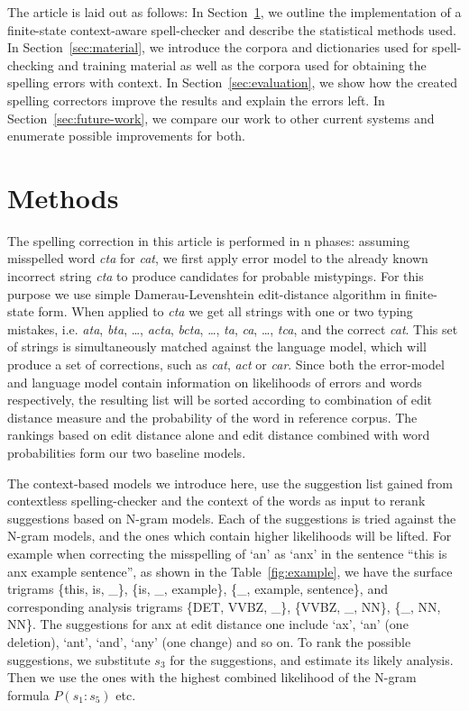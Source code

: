 \documentclass{llncs}
\begin{document}
The article is laid out as follows: In Section~\ref{sec:methods}, we outline
the implementation of a finite-state context-aware spell-checker and describe
the statistical methods used.  In Section~\ref{sec:material}, we introduce the
corpora and dictionaries used for spell-checking and training material as well
as the corpora used for obtaining the spelling errors with context. In
Section~\ref{sec:evaluation}, we show how the created spelling correctors
improve the results and explain the errors left. In
Section~\ref{sec:future-work}, we compare our work to other current systems and
enumerate possible improvements for both.

\section{Methods}
\label{sec:methods}

The spelling correction in this article is performed in n phases: assuming 
misspelled word \emph{cta} for \emph{cat}, we first apply error model to
the already known incorrect string \emph{cta} to produce candidates for probable
mistypings. For this purpose we use simple Damerau-Levenshtein edit-distance
algorithm in finite-state form. When applied to \emph{cta} we get all strings
with one or two typing mistakes, i.e. \emph{ata}, \emph{bta}, \ldots, 
\emph{acta}, \emph{bcta}, \ldots, \emph{ta}, \emph{ca}, \ldots, \emph{tca}, and
the correct \emph{cat}. This set of strings is simultaneously matched against
the language model, which will produce a set of corrections, such as 
\emph{cat}, \emph{act} or \emph{car}. Since both the error-model and language
model contain information on likelihoods of errors and words respectively, the
resulting list will be sorted according to combination of edit distance measure
and the probability of the word in reference corpus. The rankings based on
edit distance alone and edit distance combined with word probabilities form
our two baseline models. 

The context-based models we introduce here, use the suggestion list gained
from contextless spelling-checker and the context of the words as input to
rerank suggestions based on N-gram models. Each of the suggestions is tried
against the N-gram models, and the ones which contain higher likelihoods will
be lifted.
For example when correcting the misspelling of `an' as `anx' in the sentence ``this
is anx example sentence'', as shown in the Table~\ref{fig:example}, we have
the surface trigrams \{this, is, \_\}, \{is, \_, example\}, \{\_, example,
sentence\}, and corresponding analysis trigrams \{DET, VVBZ, \_\}, \{VVBZ, \_,
NN\}, \{\_, NN, NN\}. The suggestions for anx at edit distance one include
`ax', `an' (one deletion), `ant', `and', `any' (one change) and so on. To rank the
possible suggestions, we substitute $s_3$ for the suggestions, and estimate its
likely analysis. Then we use the ones with the highest combined likelihood of the N-gram
formula $P(s_1:s_5)$ etc.
\end{document}

